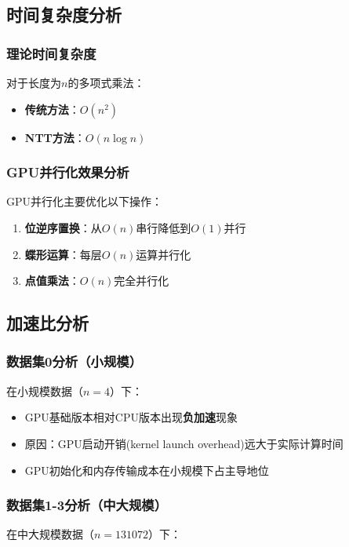 \documentclass[a4paper]{article}
\begin{document}
\subsection{时间复杂度分析}

\subsubsection{理论时间复杂度}
对于长度为$n$的多项式乘法：
\begin{itemize}
	\item \textbf{传统方法}：$O(n^2)$
	\item \textbf{NTT方法}：$O(n \log n)$
\end{itemize}

\subsubsection{GPU并行化效果分析}
GPU并行化主要优化以下操作：
\begin{enumerate}
	\item \textbf{位逆序置换}：从$O(n)$串行降低到$O(1)$并行
	\item \textbf{蝶形运算}：每层$O(n)$运算并行化
	\item \textbf{点值乘法}：$O(n)$完全并行化
\end{enumerate}

\subsection{加速比分析}

\subsubsection{数据集0分析（小规模）}
在小规模数据（$n=4$）下：
\begin{itemize}
	\item GPU基础版本相对CPU版本出现\textbf{负加速}现象
	\item 原因：GPU启动开销(kernel launch overhead)远大于实际计算时间
	\item GPU初始化和内存传输成本在小规模下占主导地位
\end{itemize}

\subsubsection{数据集1-3分析（中大规模）}
在中大规模数据（$n=131072$）下：
\end{document}
